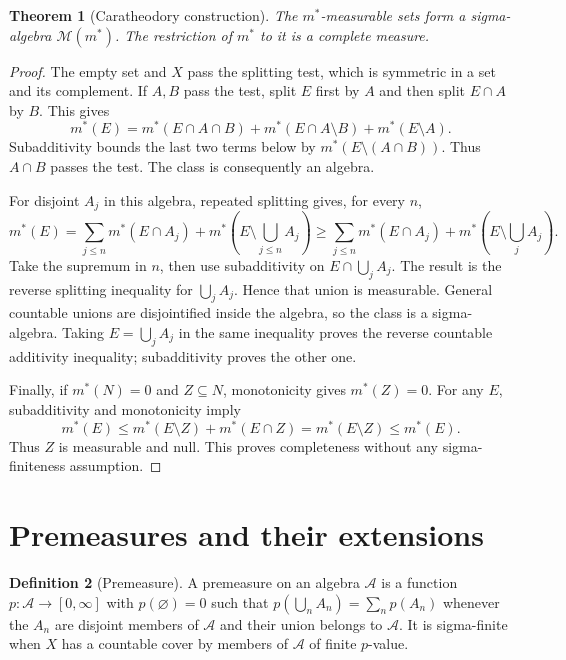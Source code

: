 \documentclass[11pt,oneside,openany]{book}
\newtheorem{theorem}{Theorem}[chapter]
\theoremstyle{definition}
\newtheorem{definition}[theorem]{Definition}
\theoremstyle{remark}
\newcommand{\calA}{\mathcal A}\newcommand{\LL}{\mathcal L}
\newcommand{\Eplus}{[0,\infty]}
\newcommand{\family}[1]{}
\begin{document}
\begin{theorem}[Caratheodory construction]
\family{D11.02.caratheodory_theorem}\label{d11:02:caratheodory-theorem}
The $m^*$-measurable sets form a sigma-algebra $\mathcal M(m^*)$.
The restriction of $m^*$ to it is a complete measure.
\end{theorem}
\begin{proof}
The empty set and $X$ pass the splitting test, which is symmetric in a set
and its complement. If $A,B$ pass the test, split $E$ first by $A$ and then
split $E\cap A$ by $B$. This gives
\[
 m^*(E)=m^*(E\cap A\cap B)+m^*(E\cap A\setminus B)+m^*(E\setminus A).
\]
Subadditivity bounds the last two terms below by
$m^*(E\setminus(A\cap B))$. Thus $A\cap B$ passes the test.
The class is consequently an algebra.

For disjoint $A_j$ in this algebra, repeated splitting gives, for every $n$,
\[
 m^*(E)=\sum_{j\leq n}m^*(E\cap A_j)
          +m^*\left(E\setminus\bigcup_{j\leq n}A_j\right)
 \geq\sum_{j\leq n}m^*(E\cap A_j)
          +m^*\left(E\setminus\bigcup_jA_j\right).
\]
Take the supremum in $n$, then use subadditivity on $E\cap\bigcup_jA_j$.
The result is the reverse splitting inequality for $\bigcup_jA_j$.
Hence that union is measurable. General countable unions are disjointified
inside the algebra, so the class is a sigma-algebra. Taking
$E=\bigcup_jA_j$ in the same inequality proves the reverse countable
additivity inequality; subadditivity proves the other one.

Finally, if $m^*(N)=0$ and $Z\subseteq N$, monotonicity gives $m^*(Z)=0$.
For any $E$, subadditivity and monotonicity imply
\[
 m^*(E)\leq m^*(E\setminus Z)+m^*(E\cap Z)
           =m^*(E\setminus Z)\leq m^*(E).
\]
Thus $Z$ is measurable and null. This proves completeness without any
sigma-finiteness assumption.
\end{proof}

\section{Premeasures and their extensions}

\begin{definition}[Premeasure]
\family{D11.02.premeasure}\label{d11:02:premeasure}
A premeasure on an algebra $\calA$ is a function $p:\calA\to\Eplus$ with
$p(\varnothing)=0$ such that
$p(\bigcup_n A_n)=\sum_n p(A_n)$ whenever the $A_n$ are disjoint members
of $\calA$ and their union belongs to $\calA$. It is sigma-finite when $X$
has a countable cover by members of $\calA$ of finite $p$-value.
\end{definition}
\end{document}
